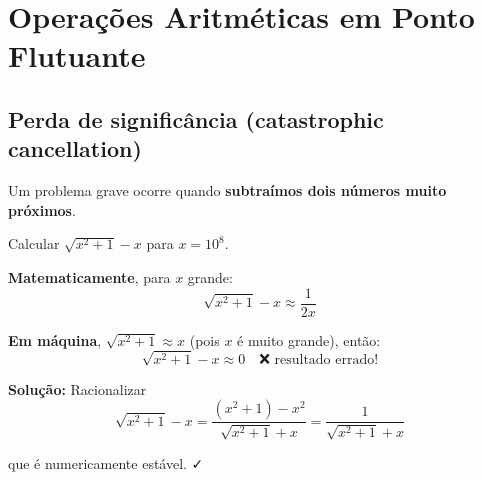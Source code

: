 \documentclass[
  11pt,
  letterpaper,
  DIV=11,
  numbers=noendperiod]{scrartcl}
\begin{document}
\section{Operações Aritméticas em Ponto
Flutuante}\label{operauxe7uxf5es-aritmuxe9ticas-em-ponto-flutuante}

\subsection{Perda de significância (catastrophic
cancellation)}\label{perda-de-significuxe2ncia-catastrophic-cancellation}

Um problema grave ocorre quando \textbf{subtraímos dois números muito
próximos}.

\begin{tcolorbox}[enhanced jigsaw, arc=.35mm, bottomrule=.15mm, bottomtitle=1mm, breakable, colback=white, colbacktitle=quarto-callout-warning-color!10!white, colframe=quarto-callout-warning-color-frame, coltitle=black, left=2mm, leftrule=.75mm, opacityback=0, opacitybacktitle=0.6, rightrule=.15mm, title=\textcolor{quarto-callout-warning-color}{\faExclamationTriangle}\hspace{0.5em}{Exemplo clássico}, titlerule=0mm, toprule=.15mm, toptitle=1mm]

Calcular \(\sqrt{x^2 + 1} - x\) para \(x = 10^8\).

\textbf{Matematicamente}, para \(x\) grande:
\[\sqrt{x^2 + 1} - x \approx \frac{1}{2x}\]

\textbf{Em máquina}, \(\sqrt{x^2 + 1} \approx x\) (pois \(x\) é muito
grande), então:
\[\sqrt{x^2 + 1} - x \approx 0 \quad \text{❌ resultado errado!}\]

\textbf{Solução:} Racionalizar
\[\sqrt{x^2 + 1} - x = \frac{(x^2 + 1) - x^2}{\sqrt{x^2 + 1} + x} = \frac{1}{\sqrt{x^2 + 1} + x}\]

que é numericamente estável. ✓

\end{tcolorbox}
\end{document}
